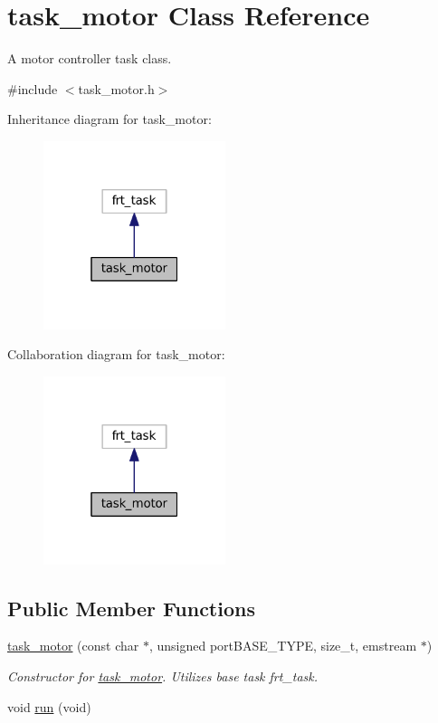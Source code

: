 \hypertarget{classtask__motor}{}\section{task\+\_\+motor Class Reference}
\label{classtask__motor}


A motor controller task class.  




{\ttfamily \#include $<$task\+\_\+motor.\+h$>$}



Inheritance diagram for task\+\_\+motor\+:
\nopagebreak
\begin{figure}[H]
\begin{center}
\leavevmode
\includegraphics[width=151pt]{classtask__motor__inherit__graph}
\end{center}
\end{figure}


Collaboration diagram for task\+\_\+motor\+:
\nopagebreak
\begin{figure}[H]
\begin{center}
\leavevmode
\includegraphics[width=151pt]{classtask__motor__coll__graph}
\end{center}
\end{figure}
\subsection*{Public Member Functions}
\begin{DoxyCompactItemize}
\item 
\mbox{\hyperlink{classtask__motor_a6ed0a0b463e698d636b28bcdd518a027}{task\+\_\+motor}} (const char $\ast$, unsigned port\+B\+A\+S\+E\+\_\+\+T\+Y\+PE, size\+\_\+t, emstream $\ast$)
\begin{DoxyCompactList}\small\item\em Constructor for \mbox{\hyperlink{classtask__motor}{task\+\_\+motor}}. Utilizes base task frt\+\_\+task. \end{DoxyCompactList}\item 
void \mbox{\hyperlink{classtask__motor_a895a075ec470c9d5a07b8959de06aacd}{run}} (void)
\end{DoxyCompactItemize}
